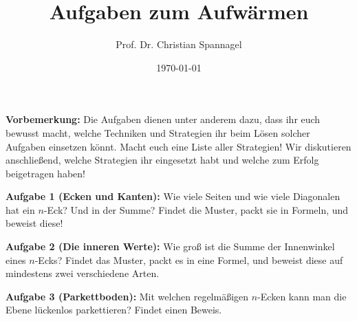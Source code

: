 \documentclass{../cssheet}
\title{Aufgaben zum Aufwärmen}
\author{Prof. Dr. Christian Spannagel}
\date{\today}
\begin{document}
\printtitle

\textbf{Vorbemerkung:}  Die Aufgaben dienen unter anderem dazu, dass ihr euch bewusst macht, welche Techniken und Strategien ihr beim Lösen solcher Aufgaben einsetzen könnt. Macht euch eine Liste aller Strategien! Wir diskutieren anschließend, welche Strategien ihr eingesetzt habt und welche zum Erfolg beigetragen haben!

\textbf{Aufgabe 1 (Ecken und Kanten):}  Wie viele Seiten und wie viele Diagonalen hat ein $n$-Eck? Und in der Summe? Findet die Muster, packt sie in Formeln, und beweist diese!

\textbf{Aufgabe 2 (Die inneren Werte):} Wie groß ist die Summe der Innenwinkel eines $n$-Ecks? Findet das Muster, packt es in eine Formel, und beweist diese auf mindestens zwei verschiedene Arten.

\textbf{Aufgabe 3 (Parkettboden):} Mit welchen regelmäßigen $n$-Ecken kann man die Ebene lückenlos parkettieren? Findet einen Beweis.


\vspace*{10mm}

\printlicense

\printsocials
\end{document}
